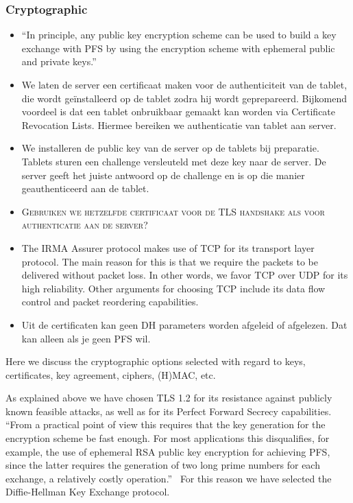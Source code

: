 \subsubsection{Cryptographic}
\sffamily
\begin{itemize}
  \item ``In principle, any public key encryption scheme can be used to build a key exchange with PFS by using the encryption scheme with ephemeral public and private keys.''~\cite{PFS}
  \item We laten de server een certificaat maken voor de authenticiteit van de tablet, die wordt geïnstalleerd op de tablet zodra hij wordt geprepareerd. Bijkomend voordeel is dat een tablet onbruikbaar gemaakt kan worden via Certificate Revocation Lists. Hiermee bereiken we authenticatie van tablet aan server.
  \item We installeren de public key van de server op de tablets bij preparatie. Tablets sturen een challenge versleuteld met deze key naar de server. De server geeft het juiste antwoord op de challenge en is op die manier geauthenticeerd aan de tablet.
  \item \textsc{Gebruiken we hetzelfde certificaat voor de TLS handshake als voor authenticatie aan de server?}
  
  \item The IRMA Assurer protocol makes use of TCP for its transport layer protocol. The main reason for this is that we require the packets to be delivered without packet loss. In other words, we favor TCP over UDP for its high reliability. Other arguments for choosing TCP include its data flow control and packet reordering capabilities.
  \item Uit de certificaten kan geen DH parameters worden afgeleid of afgelezen. Dat kan alleen als je geen PFS wil.
\end{itemize}

\rmfamily
Here we discuss the cryptographic options selected with regard to keys, certificates, key agreement, ciphers, (H)MAC, etc.

As explained above we have chosen TLS 1.2 for its resistance against publicly known feasible attacks, as well as for its Perfect Forward Secrecy capabilities. ``From a practical point of view this requires that the key generation for the encryption scheme be fast enough. For most applications this disqualifies, for example, the use of ephemeral RSA public key encryption for achieving PFS, since the latter requires the generation of two long prime numbers for each exchange, a relatively costly operation.''~\cite{PFS} For this reason we have selected the Diffie-Hellman Key Exchange protocol.

